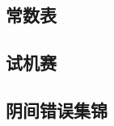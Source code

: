 \documentclass[10pt, a4paper, oneside]{ctexart}
\begin{document}
\begin{multicols}{2}
        \subsection{常数表}
        
        \subsection{试机赛}
        
        \subsection{阴间错误集锦}
        
    \end{multicols}
\end{document}
